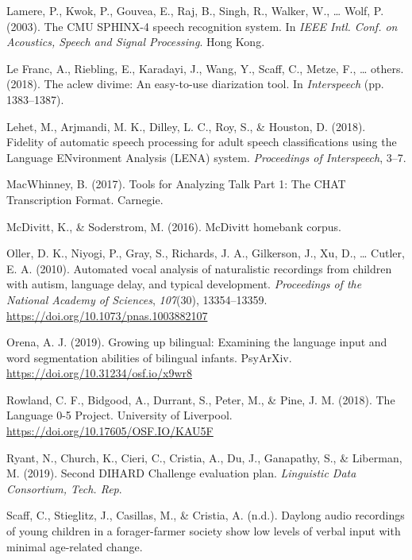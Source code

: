 \documentclass[english,table,man,floatsintext]{apa6}
\begin{document}
\leavevmode\hypertarget{ref-lamere2003cmu}{}%
Lamere, P., Kwok, P., Gouvea, E., Raj, B., Singh, R., Walker, W., \ldots{} Wolf, P. (2003). The CMU SPHINX-4 speech recognition system. In \emph{IEEE Intl. Conf. on Acoustics, Speech and Signal Processing}. Hong Kong.

\leavevmode\hypertarget{ref-le2018aclew}{}%
Le Franc, A., Riebling, E., Karadayi, J., Wang, Y., Scaff, C., Metze, F., \ldots{} others. (2018). The aclew divime: An easy-to-use diarization tool. In \emph{Interspeech} (pp. 1383--1387).

\leavevmode\hypertarget{ref-Lehet2018}{}%
Lehet, M., Arjmandi, M. K., Dilley, L. C., Roy, S., \& Houston, D. (2018). Fidelity of automatic speech processing for adult speech classifications using the Language ENvironment Analysis (LENA) system. \emph{Proceedings of Interspeech}, 3--7.

\leavevmode\hypertarget{ref-macwhinney2017tools}{}%
MacWhinney, B. (2017). Tools for Analyzing Talk Part 1: The CHAT Transcription Format. Carnegie.

\leavevmode\hypertarget{ref-mcdivitt2016mcdivitt}{}%
McDivitt, K., \& Soderstrom, M. (2016). McDivitt homebank corpus.

\leavevmode\hypertarget{ref-Oller}{}%
Oller, D. K., Niyogi, P., Gray, S., Richards, J. A., Gilkerson, J., Xu, D., \ldots{} Cutler, E. A. (2010). Automated vocal analysis of naturalistic recordings from children with autism, language delay, and typical development. \emph{Proceedings of the National Academy of Sciences}, \emph{107}(30), 13354--13359. \url{https://doi.org/10.1073/pnas.1003882107}

\leavevmode\hypertarget{ref-orena_2019}{}%
Orena, A. J. (2019). Growing up bilingual: Examining the language input and word segmentation abilities of bilingual infants. PsyArXiv. \url{https://doi.org/10.31234/osf.io/x9wr8}

\leavevmode\hypertarget{ref-rowland2018}{}%
Rowland, C. F., Bidgood, A., Durrant, S., Peter, M., \& Pine, J. M. (2018). The Language 0-5 Project. University of Liverpool. \url{https://doi.org/10.17605/OSF.IO/KAU5F}

\leavevmode\hypertarget{ref-ryant2019second}{}%
Ryant, N., Church, K., Cieri, C., Cristia, A., Du, J., Ganapathy, S., \& Liberman, M. (2019). Second DIHARD Challenge evaluation plan. \emph{Linguistic Data Consortium, Tech. Rep}.

\leavevmode\hypertarget{ref-scaff}{}%
Scaff, C., Stieglitz, J., Casillas, M., \& Cristia, A. (n.d.). Daylong audio recordings of young children in a forager-farmer society show low levels of verbal input with minimal age-related change.
\end{document}
